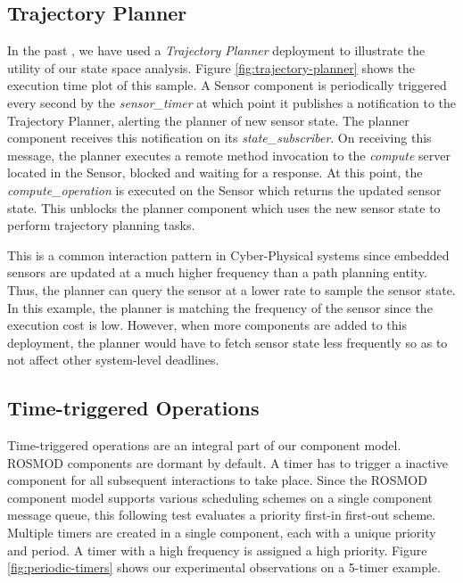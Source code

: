 \subsection{Trajectory Planner}

In the past \cite{kumar2014colored}, we have used a \emph{Trajectory Planner} deployment to illustrate the utility of our state space analysis. Figure \ref{fig:trajectory-planner} shows the execution time plot of this sample. A Sensor component is periodically triggered every second by the \emph{sensor\_timer} at which point it publishes a notification to the Trajectory Planner, alerting the planner of new sensor state. The planner component receives this notification on its \emph{state\_subscriber}. On receiving this message, the planner executes a remote method invocation to the \emph{compute} server located in the Sensor, blocked and waiting for a response. At this point, the \emph{compute\_operation} is executed on the Sensor which returns the updated sensor state. This unblocks the planner component which uses the new sensor state to perform trajectory planning tasks. 

This is a common interaction pattern in Cyber-Physical systems since embedded sensors are updated at a much higher frequency than a path planning entity. Thus, the planner can query the sensor at a lower rate to sample the sensor state. In this example, the planner is matching the frequency of the sensor since the execution cost is low. However, when more components are added to this deployment, the planner would have to fetch sensor state less frequently so as to not affect other system-level deadlines.  

\fi

\vspace{-0.05in}

\subsection{Time-triggered Operations}

Time-triggered operations are an integral part of our component model. ROSMOD components are dormant by default. A timer has to trigger a inactive component for all subsequent interactions to take place. Since the ROSMOD component model supports various scheduling schemes on a single component message queue, this following test evaluates a priority first-in first-out scheme. Multiple timers are created in a single component, each with a unique priority and period. A timer with a high frequency is assigned a high priority. Figure \ref{fig:periodic-timers} shows our experimental observations on a 5-timer example. 

